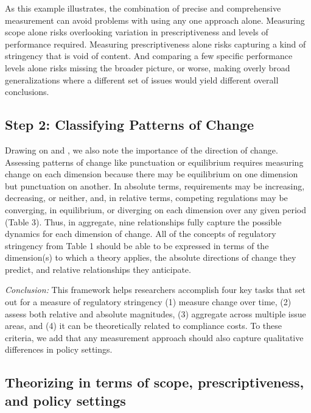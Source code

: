 \documentclass[
      12pt,
            Review ]{article}
\begin{document}
As this example illustrates, the combination of precise and
comprehensive measurement can avoid problems with using any one approach
alone. Measuring scope alone risks overlooking variation in
prescriptiveness and levels of performance required. Measuring
prescriptiveness alone risks capturing a kind of stringency that is void
of content. And comparing a few specific performance levels alone risks
missing the broader picture, or worse, making overly broad
generalizations where a different set of issues would yield different
overall conclusions.

\subsection{Step 2: Classifying Patterns of
Change}\label{step-2-classifying-patterns-of-change}

Drawing on \citet{Baumgartner2002} and \citet{Howlett2007}, we also note
the importance of the direction of change. Assessing patterns of change
like punctuation or equilibrium requires measuring change on each
dimension because there may be equilibrium on one dimension but
punctuation on another. In absolute terms, requirements may be
increasing, decreasing, or neither, and, in relative terms, competing
regulations may be converging, in equilibrium, or diverging on each
dimension over any given period (Table 3). Thus, in aggregate, nine
relationships fully capture the possible dynamics for each dimension of
change. All of the concepts of regulatory stringency from Table 1 should
be able to be expressed in terms of the dimension(s) to which a theory
applies, the absolute directions of change they predict, and relative
relationships they anticipate.

\emph{Conclusion:} This framework helps researchers accomplish four key
tasks that \citet{Brunel2016} set out for a measure of regulatory
stringency (1) measure change over time, (2) assess both relative and
absolute magnitudes, (3) aggregate across multiple issue areas, and (4)
it can be theoretically related to compliance costs. To these criteria,
we add that any measurement approach should also capture qualitative
differences in policy settings.

\subsection{Theorizing in terms of scope, prescriptiveness, and policy
settings}\label{theorizing-in-terms-of-scope-prescriptiveness-and-policy-settings}
\end{document}
